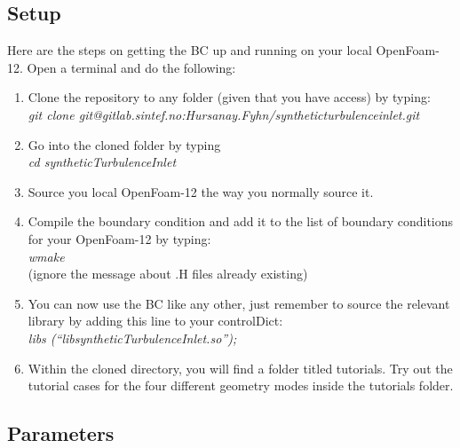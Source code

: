 \subsection{Setup}%
\label{sub:Setup}

Here are the steps on getting the BC up and running on your local OpenFoam-12.
Open a terminal and do the following:
\begin{enumerate}
  \item Clone the repository to any folder (given that you have access) by typing:\\ \textit{git clone git@gitlab.sintef.no:Hursanay.Fyhn/syntheticturbulenceinlet.git}
  \item Go into the cloned folder by typing\\ \textit{cd syntheticTurbulenceInlet}
  \item Source you local OpenFoam-12 the way you normally source it.
  \item Compile the boundary condition and add it to the list of boundary conditions for your OpenFoam-12 by typing:\\ \textit{wmake}
    \\ (ignore the message about .H files already existing)
  \item You can now use the BC like any other, just remember to source the relevant library by adding this line to your controlDict:\\
    \textit{libs (``libsyntheticTurbulenceInlet.so'');}
  \item Within the cloned directory, you will find a folder titled tutorials. Try out the tutorial cases for the four different geometry modes inside the tutorials folder.
\end{enumerate}

\subsection{Parameters}%
\label{sub:Parameters}

